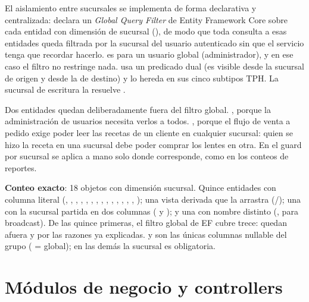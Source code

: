 El aislamiento entre sucursales se implementa de forma declarativa y centralizada:  declara un \emph{Global Query Filter} de Entity Framework Core sobre cada entidad con dimensión de sucursal (), de modo que toda consulta a esas entidades queda filtrada por la sucursal del usuario autenticado sin que el servicio tenga que recordar hacerlo.  es  para un usuario global (administrador), y en ese caso el filtro no restringe nada. \allowbreak {} usa un predicado dual (es visible desde la sucursal de origen y desde la de destino) y  lo hereda en sus cinco subtipos TPH. La sucursal de escritura la resuelve \allowbreak {}.

Dos entidades quedan deliberadamente fuera del filtro global. , porque la administración de usuarios necesita verlos a todos. , porque el flujo de venta a pedido exige poder leer las recetas de un cliente en cualquier sucursal: quien se hizo la receta en una sucursal debe poder comprar los lentes en otra. En  el guard por sucursal se aplica a mano solo donde corresponde, como en los conteos de reportes.

\textbf{Conteo exacto}: 18 objetos con dimensión sucursal. Quince entidades con columna  literal (, , , , , , , , , , \allowbreak {}, , , \allowbreak {}, ); una vista derivada que la arrastra (/); una con la sucursal partida en dos columnas (\allowbreak {} y ); y una con nombre distinto (\allowbreak {}, para broadcast). De las quince primeras, el filtro global de EF cubre trece: quedan afuera  y  por las razones ya explicadas.  y \allowbreak {} son las únicas columnas nullable del grupo ( = global); en las demás la sucursal es obligatoria.

\section{Módulos de negocio y controllers}
\label{sec:arch-modulos-controllers}

